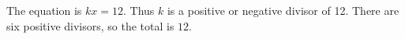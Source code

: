 The equation is $ kx=12 $. Thus $ k $ is a positive or negative divisor of 12. There are six positive divisors, so the total is $\boxed{12}$.
